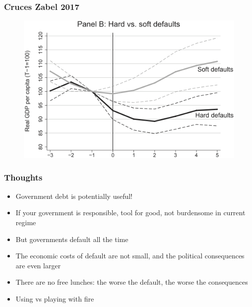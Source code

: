 \documentclass{beamer}
\begin{document}
\begin{frame}
\frametitle{Cruces Zabel 2017 }
\begin{figure}
\centering
\includegraphics[scale=1]{Cruces2.png}
\end{figure}
\end{frame}


\begin{frame}
\frametitle{Thoughts}
\begin{itemize}
\item Government debt is potentially useful!
\bigskip
\item If your government is responsible, tool for good, not burdensome in current regime
\bigskip
\item But governments default all the time
\bigskip
\item The economic costs of default are not small, and the political consequences are even larger
\bigskip
\item There are no free lunches: the worse the default, the worse the consequences
\bigskip
\item Using vs playing with fire
\end{itemize}
\end{frame}
\end{document}
